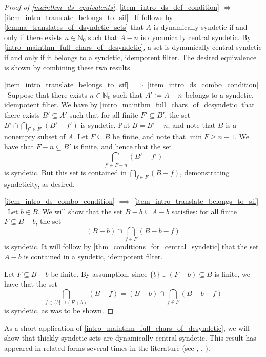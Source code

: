 \documentclass[letter,11pt]{article}
\theoremstyle{plain}
\theoremstyle{definition}
\theoremstyle{plain}
\theoremstyle{plain}
\numberwithin{equation}{section}
\newcommand{\N}{\mathbb{N}}
\newcommand{\defeq}{\vcentcolon=}
\renewcommand{\geq}{\geqslant}
\begin{document}
\begin{proof}[Proof of \cref{mainthm_ds_equivalents}]
    \eqref{item_intro_ds_def_condition} $\iff$ \eqref{item_intro_translate_belongs_to_sif} \ If follows by \cref{lemma_translates_of_dsyndetic_sets} that $A$ is dynamically syndetic if and only if there exists $n \in \N_0$ such that $A-n$ is dynamically central syndetic.  By \cref{intro_mainthm_full_chars_of_dcsyndetic}, a set is dynamically central syndetic if and only if it belongs to a syndetic, idempotent filter.  The desired equivalence is shown by combining these two results.

    \eqref{item_intro_translate_belongs_to_sif} $\implies$ \eqref{item_intro_ds_combo_condition} \ Suppose that there exists $n \in \N_0$ such that $A' \defeq A - n$ belongs to a syndetic, idempotent filter.  We have by \cref{intro_mainthm_full_chars_of_dcsyndetic} that there exists $B' \subseteq A'$ such that for all finite $F' \subseteq B'$, the set $B' \cap \bigcap_{f' \in F'} (B' - f')$ is syndetic.  Put $B = B' + n$, and note that $B$ is a nonempty subset of $A$.  Let $F \subseteq B$ be finite, and note that $\min F \geq n+1$.  We have that $F-n \subseteq B'$ is finite, and hence that the set
    \[\bigcap_{f' \in F-n} (B' - f')\]
    is syndetic.  But this set is contained in $\bigcap_{f \in F} (B - f)$, demonstrating syndeticity, as desired.

    \eqref{item_intro_ds_combo_condition} $\implies$ \eqref{item_intro_translate_belongs_to_sif} \ Let $b \in B$.  We will show that the set $B - b \subseteq A-b$ satisfies: for all finite $F \subseteq B-b$, the set
    \[(B-b) \cap \bigcap_{f \in F} (B - b - f)\]
    is syndetic.  It will follow by \cref{thm_conditions_for_central_syndetic} that the set $A-b$ is contained in a syndetic, idempotent filter.

    Let $F \subseteq B-b$ be finite.  By assumption, since $\{b\} \cup (F + b) \subseteq B$ is finite, we have that the set 
    \[\bigcap_{f \in \{b\} \cup (F + b)} (B - f) = (B-b) \cap \bigcap_{f \in F} (B - b - f)\]
    is syndetic, as was to be shown.
\end{proof}

As a short application of \cref{intro_mainthm_full_chars_of_dcsyndetic}, we will show that thickly syndetic sets are dynamically central syndetic.  This result has appeared in related forms several times in the literature (see \cite[Thm. 1]{Glasner-Weiss-Interpolation}, \cite[Thm. 2.4]{huang_ye_2005}, \cite[Prop. 4.4]{dong_shao_ye_2012}).
\end{document}
